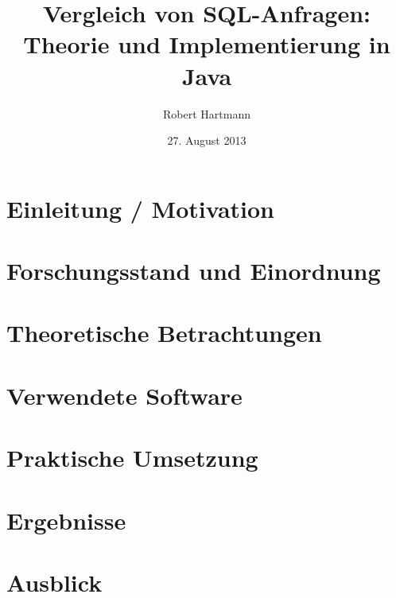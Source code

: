 \documentclass[12pt]{scrreprt}
\author{Robert Hartmann}
\title{Vergleich von SQL-Anfragen: Theorie und Implementierung in Java}
\date{27. August 2013}
\theoremstyle{remark}
\begin{document}

%

\pagestyle{plain}
\tableofcontents

\onehalfspacing

\chapter{Einleitung / Motivation}
\label{chap:introduction}


\chapter{Forschungsstand und Einordnung}
\label{chap:forschung}


\chapter{Theoretische Betrachtungen}
\label{chap:theorie}


\chapter{Verwendete Software}
\label{chap:software}


\chapter{Praktische Umsetzung}
\label{chap:praxis}


\chapter{Ergebnisse}


\chapter{Ausblick}

\end{document}
